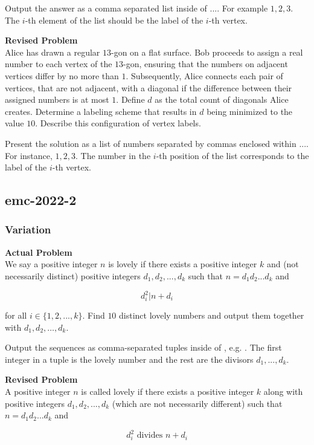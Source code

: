 Output the answer as a comma separated list inside of $\boxed{...}$. For example $\boxed{1, 2, 3}$.
The $i$-th element of the list should be the label of the $i$-th vertex.

\textbf{Revised Problem}\\
Alice has drawn a regular $13$-gon on a flat surface. Bob proceeds to assign a real number to each vertex of the $13$-gon, ensuring that the numbers on adjacent vertices differ by no more than $1$. Subsequently, Alice connects each pair of vertices, that are not adjacent, with a diagonal if the difference between their assigned numbers is at most $1$. Define $d$ as the total count of diagonals Alice creates. Determine a labeling scheme that results in $d$ being minimized to the value $10$. Describe this configuration of vertex labels.

Present the solution as a list of numbers separated by commas enclosed within $\boxed{...}$. For instance, $\boxed{1, 2, 3}$.
The number in the $i$-th position of the list corresponds to the label of the $i$-th vertex.

\subsection{emc-2022-2}
\subsubsection{Variation}
\textbf{Actual Problem}\\
We say a positive integer $n$ is lovely if there exists a positive integer $k$ and (not necessarily distinct) positive integers $d_1, d_2, ..., d_k$ such that $n = d_1 d_2 ... d_k$ and

$$d_i^2 | n + d_i$$

for all $i \in \{1, 2, ..., k\}$. Find $10$ distinct lovely numbers and output them together with $d_1, d_2, \ldots, d_k$.

Output the sequences as comma-separated tuples inside of \boxed, e.g. . The first integer in a tuple is the lovely number and the rest are the divisors $d_1, ..., d_k$.

\textbf{Revised Problem}\\
A positive integer $n$ is called lovely if there exists a positive integer $k$ along with positive integers $d_1, d_2, ..., d_k$ (which are not necessarily different) such that $n = d_1 d_2 ... d_k$ and 

$$d_i^2 \text{ divides } n + d_i$$ 

